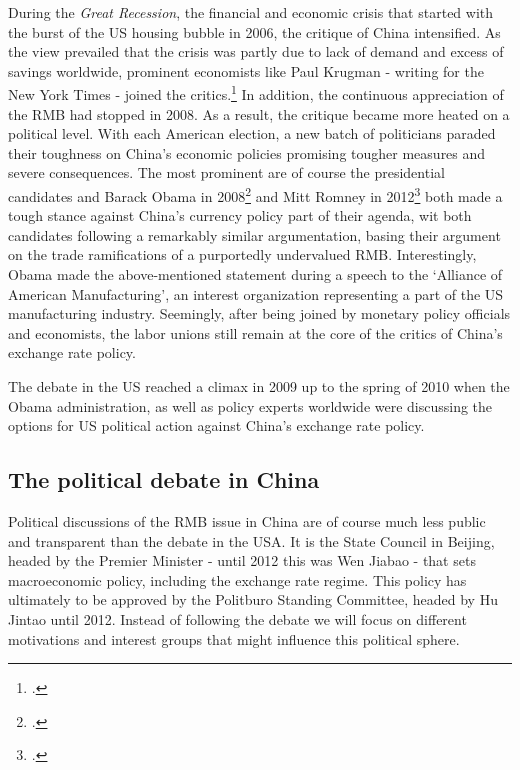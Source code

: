 During the \emph{Great Recession}, the financial and economic crisis that started with the burst of the US housing bubble in 2006, the critique of China intensified. As the view prevailed that the crisis was partly due to lack of demand and excess of savings worldwide, prominent economists like Paul Krugman - writing for the New York Times - joined the critics.\footnote{\cite{Krugman2009}.} In addition, the continuous appreciation of the RMB had stopped in 2008. As a result, the critique became more heated on a political level. With each American election, a new batch of politicians paraded their 
toughness on China's economic policies promising tougher measures and 
severe consequences. The most prominent are of course the presidential candidates and  Barack Obama in 
2008\footnote{\cite{Obama2008}.} and Mitt Romney in 2012\footnote{\cite{Romney2012}.} both made a tough stance against China's currency policy part of their agenda, wit both candidates following a remarkably similar argumentation, basing their argument on the trade ramifications of a 
purportedly undervalued RMB. Interestingly, Obama made the above-mentioned statement during a speech to the `Alliance of American 
Manufacturing', an interest organization representing a part of the US 
manufacturing industry. Seemingly, after being joined by monetary policy officials and economists, the labor unions still remain at the core of the critics of China's exchange rate policy.



The debate in the US reached a climax in 2009 up to the spring of 2010 when the Obama administration, as well as policy experts worldwide were discussing the options for US political action against China's exchange rate policy.


\subsection{The political debate in China}


Political discussions of the RMB issue in China are of course much less public and 
transparent than the debate in the USA. It is the State Council in 
Beijing, headed by the Premier Minister - until 2012 this was Wen Jiabao 
- that sets macroeconomic policy, including the exchange rate regime.  
This policy has ultimately to be approved by the Politburo Standing 
Committee, headed by Hu Jintao until 2012. Instead of following the 
debate we will focus on different motivations and interest groups that 
might influence this political sphere.

